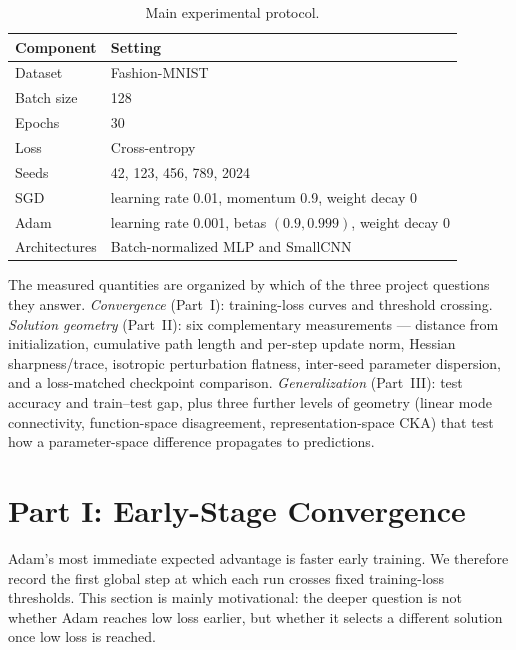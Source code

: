 \documentclass[11pt]{article}
\begin{document}
\begin{table}[H]
\centering
\begin{tabular}{ll}
\toprule
\textbf{Component} & \textbf{Setting}\\
\midrule
Dataset & Fashion-MNIST\\
Batch size & 128\\
Epochs & 30\\
Loss & Cross-entropy\\
Seeds & 42, 123, 456, 789, 2024\\
SGD & learning rate 0.01, momentum 0.9, weight decay 0\\
Adam & learning rate 0.001, betas $(0.9,0.999)$, weight decay 0\\
Architectures & Batch-normalized MLP and SmallCNN\\
\bottomrule
\end{tabular}
\caption{Main experimental protocol.}
\label{tab:setup}
\end{table}

The measured quantities are organized by which of the three project questions they answer. \emph{Convergence} (Part~I): training-loss curves and threshold crossing. \emph{Solution geometry} (Part~II): six complementary measurements --- distance from initialization, cumulative path length and per-step update norm, Hessian sharpness/trace, isotropic perturbation flatness, inter-seed parameter dispersion, and a loss-matched checkpoint comparison. \emph{Generalization} (Part~III): test accuracy and train--test gap, plus three further levels of geometry (linear mode connectivity, function-space disagreement, representation-space CKA) that test how a parameter-space difference propagates to predictions.

\section{Part I: Early-Stage Convergence}

Adam's most immediate expected advantage is faster early training. We therefore record the first global step at which each run crosses fixed training-loss thresholds. This section is mainly motivational: the deeper question is not whether Adam reaches low loss earlier, but whether it selects a different solution once low loss is reached.
\end{document}
